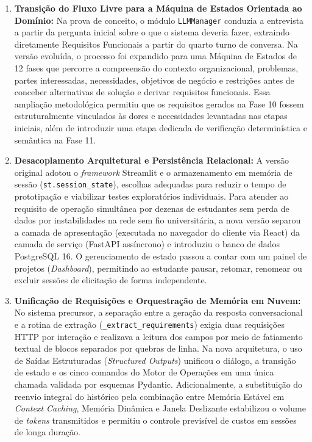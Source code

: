 \begin{enumerate}
    \item \textbf{Transição do Fluxo Livre para a Máquina de Estados Orientada ao Domínio:} Na prova de conceito, o módulo \texttt{LLMManager} conduzia a entrevista a partir da pergunta inicial sobre o que o sistema deveria fazer, extraindo diretamente Requisitos Funcionais a partir do quarto turno de conversa. Na versão evoluída, o processo foi expandido para uma Máquina de Estados de 12 fases que percorre a compreensão do contexto organizacional, problemas, partes interessadas, necessidades, objetivos de negócio e restrições antes de conceber alternativas de solução e derivar requisitos funcionais. Essa ampliação metodológica permitiu que os requisitos gerados na Fase 10 fossem estruturalmente vinculados às dores e necessidades levantadas nas etapas iniciais, além de introduzir uma etapa dedicada de verificação determinística e semântica na Fase 11.
    \item \textbf{Desacoplamento Arquitetural e Persistência Relacional:} A versão original adotou o \textit{framework} Streamlit e o armazenamento em memória de sessão (\texttt{st.\allowbreak session\_\allowbreak state}), escolhas adequadas para reduzir o tempo de prototipação e viabilizar testes exploratórios individuais. Para atender ao requisito de operação simultânea por dezenas de estudantes sem perda de dados por instabilidades na rede sem fio universitária, a nova versão separou a camada de apresentação (executada no navegador do cliente via React) da camada de serviço (FastAPI assíncrono) e introduziu o banco de dados PostgreSQL 16. O gerenciamento de estado passou a contar com um painel de projetos (\textit{Dashboard}), permitindo ao estudante pausar, retomar, renomear ou excluir sessões de elicitação de forma independente.
    \item \textbf{Unificação de Requisições e Orquestração de Memória em Nuvem:} No sistema precursor, a separação entre a geração da resposta conversacional e a rotina de extração (\texttt{\_extract\_requirements}) exigia duas requisições HTTP por interação e realizava a leitura dos campos por meio de fatiamento textual de blocos separados por quebras de linha. Na nova arquitetura, o uso de Saídas Estruturadas (\textit{Structured Outputs}) unificou o diálogo, a transição de estado e os cinco comandos do Motor de Operações em uma única chamada validada por esquemas Pydantic. Adicionalmente, a substituição do reenvio integral do histórico pela combinação entre Memória Estável em \textit{Context Caching}, Memória Dinâmica e Janela Deslizante estabilizou o volume de \textit{tokens} transmitidos e permitiu o controle previsível de custos em sessões de longa duração.

\end{enumerate}
